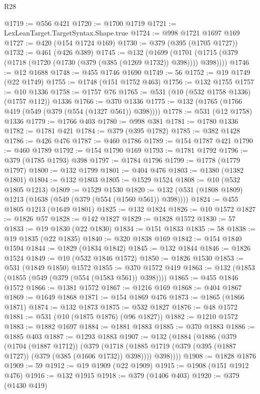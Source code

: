 \begin{lexlean}{R28}
\begin{coremodule}
@1719 := @556 @421
@1720 := @1700 @1719
@1721 := LexLeanTarget.TargetSyntax.Shape.true
@1724 := @998 @1721 @1697 @169
@1727 := @420 (@154 @1724 @169)
@1730 := @379 (@395 (@1705 @1727))
@1732 := @461 (@426 @389)
@1745 := @132
    (@1699 (@1701 (@1715 (@379 (@1718 (@1720 (@1730 (@379 (@385 (@1269 @1732)) @398)))) @398))))
@1746 := @12 @1688
@1748 := @455 @1746 @1690
@1749 := 56
@1752 := @19 @1749 (@22 @1749)
@1755 := @1748 (@151 @1752 @463)
@1756 := @132 @1755
@1757 := @10 @1336
@1758 := @1757 @76
@1765 := @531 (@10 (@532 @1758 @1336) (@1757 @112)) @1336
@1766 := @370 @1336
@1775 := @132 (@1765 (@1766 @419 (@549 (@379 (@554 (@1327 @561)) @398))))
@1778 := @531 (@12 @1758) @1336
@1779 := @1766 @403
@1780 := @998 @381
@1781 := @1780 @1336
@1782 := @1781 @421
@1784 := @379 (@395 @1782)
@1785 := @382 @1428
@1786 := @426 @476
@1787 := @460 @1786
@1789 := @154 @1787 @421
@1790 := @460 @1789
@1792 := @154 @1790 @169
@1793 := @1781 @1792
@1796 := @379 (@1785 @1793) @398
@1797 := @1784 @1796
@1799 := @1778 (@1779 @1797)
@1800 := @132 @1799
@1801 := @404 @476
@1803 := @1380 (@1382 @1801)
@1804 := @132 @1803
@1805 := @1529 @1524
@1808 := @10 (@532 @1805 @1213)
@1809 := @1529 @1530
@1820 := @132 (@531 (@1808 @1809) @1213 (@1638 (@549 (@379 (@554 (@1560 @561)) @398))))
@1824 := @455 @1805 @1213 (@1649 @1801)
@1825 := @132 @1824
@1826 := @10 @1572
@1827 := @1826 @57
@1828 := @142 @1827
@1829 := @1828 @1572
@1830 := 57
@1833 := @19 @1830 (@22 @1830)
@1834 := @151 @1833
@1835 := 58
@1838 := @19 @1835 (@22 @1835)
@1840 := @320 @1838 @169
@1842 := @154 @1840 @1594
@1844 := @1829 (@1834 @1842)
@1845 := @132 @1844
@1846 := @1826 @1524
@1849 := @10 (@532 @1846 @1572)
@1850 := @1826 @1530
@1853 := @531 (@1849 @1850) @1572
@1855 := @370 @1572 @419
@1863 := @132 (@1853 (@1855 (@549 (@379 (@554 (@1583 @561)) @398))))
@1865 := @455 @1846 @1572
@1866 := @1381 @1572
@1867 := @1216 @169
@1868 := @404 @1867
@1869 := @1649 @1868
@1871 := @154 @1869 @476
@1873 := @1865 (@1866 @1871)
@1874 := @132 @1873
@1875 := @532 @1827
@1876 := @48 @1572
@1881 := @531 (@10 (@1875 @1876) (@96 @1827))
@1882 := @1210 @1572
@1883 := @1882 @1697
@1884 := @1881 @1883
@1885 := @370 @1883
@1886 := @1885 @403
@1887 := @1293 @1883
@1907 := @132
    (@1884
      (@1886
        (@379
          (@1704 (@1887 @1712))
          (@379
            (@1718 (@1885 @1719 (@379 (@395 (@1887 @1727)) (@379 (@385 (@1606 @1732)) @398))))
            @398))))
@1908 := @1828 @1876
@1909 := 59
@1912 := @19 @1909 (@22 @1909)
@1915 := @1908 (@151 @1912 @476)
@1916 := @132 @1915
@1918 := @379 (@1406 @403)
@1920 := @379 (@1430 @419)

\end{coremodule}
\end{lexlean}
